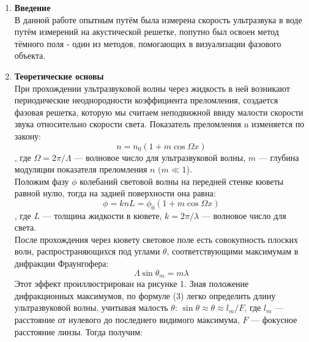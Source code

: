 \documentclass[a4paper]{article}
\begin{document}
\begin{multicols}{2}

\begin{enumerate}
\small
\item \textbf{Введение}\\ 
В данной работе опытным путём была измерена скорость ультразвука в воде путём измерений на акустической решетке, попутно был освоен метод тёмного поля - один из методов, помогающих в визуализации фазового объекта. \\
\item \textbf{Теоретические основы}\\
При прохождении ультразвуковой волны через жидкость в ней возникают периодические неоднородности коэффициента преломления, создается фазовая решетка, которую мы считаем неподвижной ввиду малости скорости звука относительно скорости света. Показатель преломления n изменяется по закону:
	\begin{equation}\label{trivial}
	n = n_0 (1 + m \cos \Omega x)
	\end{equation}
	, где $ \Omega = 2 \pi / \Lambda $ --- волновое число для ультразвуковой волны, $ m $ --- глубина модуляции показателя преломления $ n $ $ (m \ll 1 $).\\
Положим фазу $ \phi $ колебаний световой волны на передней стенке кюветы равной нулю, тогда на задней поверхности она равна:
	\begin{equation}\label{}
	\phi  = k n L = \phi_0 (1 + m \cos \Omega x)
	\end{equation}
	, где $ L $ --- толщина жидкости в кювете, $ k = 2 \pi / \lambda $ --- волновое число для света.\\
	После прохождения через кювету световое поле есть совокупность плоских волн, распространяющихся под углами $ \theta $, соответствующими максимумам в дифракции Фраунгофера:\\
\begin{equation}\label{}	
	\Lambda \sin \theta_m = m \lambda
\end{equation}
Этот эффект проиллюстрирован на рисунке 1.
	Зная положение дифракционных максимумов, по формуле (3) легко определить длину ультразвуковой волны, учитывая малость $ \theta $: $ \sin \theta \approx \theta \approx l_m /F  $, где $ l_m $ --- расстояние от нулевого до последнего видимого максимума, $ F $ --- фокусное расстояние линзы. Тогда получим:
	

\end{enumerate}
\end{multicols}
\end{document}
